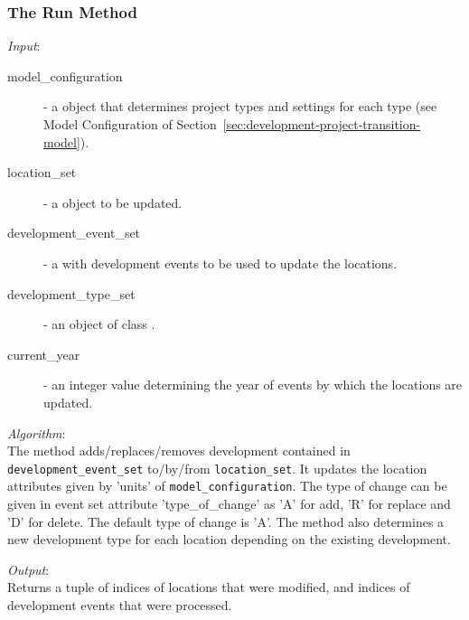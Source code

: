 \subsubsection{The Run Method}
%
{\it Input}:
\begin{description}
\item[model_configuration] - a  object that determines
  project types and settings for each type (see Model Configuration of
  Section~\ref{sec:development-project-transition-model}).
\item[location_set] - a  object to be updated.
\item[development_event_set] - a  with development
  events to be used to update the locations.
\item[development_type_set] - an object of class .
\item[current_year] - an integer value determining the year of events by
  which the locations are updated.
\end{description}

{\it Algorithm}:\\[1mm]
The method adds/replaces/removes development contained in \verb|development_event_set| 
to/by/from \verb|location_set|. It updates the location attributes
given by 'units' of \verb|model_configuration|. The type of change can be given 
in event set attribute 'type_of_change' as 'A' for add, 'R' for replace and 'D' for delete.
The default type of change is 'A'. The method also determines a new development type 
for each location depending on the existing development. 
 

{\it Output}:~\\[1mm]
Returns a tuple of indices of locations that were modified, and indices of
development events that were processed.

